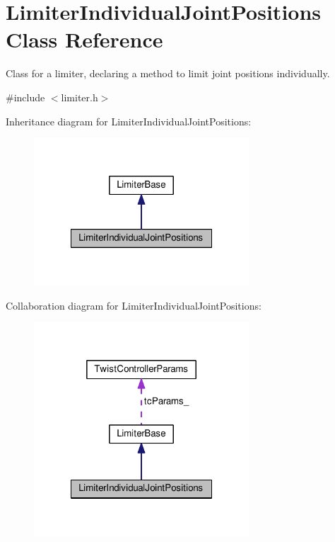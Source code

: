 \hypertarget{classLimiterIndividualJointPositions}{\section{Limiter\-Individual\-Joint\-Positions Class Reference}
\label{classLimiterIndividualJointPositions}
}


Class for a limiter, declaring a method to limit joint positions individually.  




{\ttfamily \#include $<$limiter.\-h$>$}



Inheritance diagram for Limiter\-Individual\-Joint\-Positions\-:
\nopagebreak
\begin{figure}[H]
\begin{center}
\leavevmode
\includegraphics[width=228pt]{classLimiterIndividualJointPositions__inherit__graph}
\end{center}
\end{figure}


Collaboration diagram for Limiter\-Individual\-Joint\-Positions\-:
\nopagebreak
\begin{figure}[H]
\begin{center}
\leavevmode
\includegraphics[width=228pt]{classLimiterIndividualJointPositions__coll__graph}
\end{center}
\end{figure}
